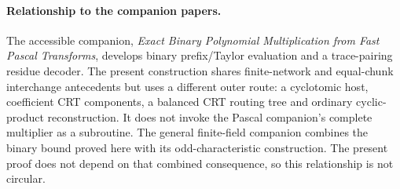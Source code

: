 \documentclass[11pt]{article}
\begin{document}
\paragraph{Relationship to the companion papers.}
The accessible companion, \emph{Exact Binary Polynomial Multiplication
from Fast Pascal Transforms}, develops binary prefix/Taylor evaluation
and a trace-pairing residue decoder. The present construction shares
finite-network and equal-chunk interchange antecedents but uses a
different outer route: a cyclotomic host, coefficient CRT components,
a balanced CRT routing tree and ordinary cyclic-product reconstruction.
It does not invoke the Pascal companion's complete multiplier as a
subroutine. The general finite-field companion combines the binary
bound proved here with its odd-characteristic construction. The present
proof does not depend on that combined consequence, so this relationship
is not circular.
\end{document}
